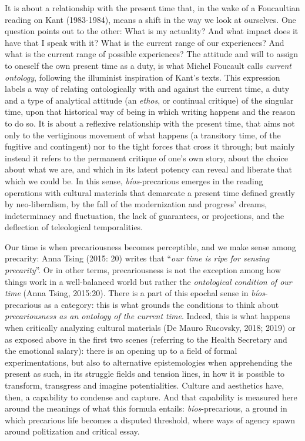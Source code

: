 \documentclass[a4paper,]{scrartcl}
\begin{document}
It is about a relationship with the present time that, in the wake of a
Foucaultian reading on Kant (1983-1984), means a shift in the way we
look at ourselves. One question points out to the other: What is my
actuality? And what impact does it have that I speak with it? What is
the current range of our experiences? And what is the current range of
possible experiences? The attitude and will to assign to oneself the own
present time as a duty, is what Michel Foucault calls \emph{current
ontology}, following the illuminist inspiration of Kant's texts. This
expression labels a way of relating ontologically with and against the
current time, a duty and a type of analytical attitude (an \emph{ethos},
or continual critique) of the singular time, upon that historical way of
being in which writing happens and the reason to do so. It is about a
reflexive relationship with the present time, that aims not only to the
vertiginous movement of what happens (a transitory time, of the fugitive
and contingent) nor to the tight forces that cross it through; but
mainly instead it refers to the permanent critique of one's own story,
about the choice about what we are, and which in its latent potency can
reveal and liberate that which we could be. In this sense,
\emph{bíos}-precarious emerges in the reading operations with cultural
materials that demarcate a present time defined greatly by
neo-liberalism, by the fall of the modernization and progress' dreams,
indeterminacy and fluctuation, the lack of guarantees, or projections,
and the deflection of teleological temporalities.

Our time is when precariousness becomes perceptible, and we make sense
among precarity: Anna Tsing (2015: 20) writes that ``\emph{our time is
ripe for sensing precarity}''. Or in other terms, precariousness is not
the exception among how things work in a well-balanced world but rather
the \emph{ontological condition of our time} (Anna Tsing, 2015:20).
There is a part of this epochal sense in \emph{bíos}-precarious as a
category: this is what grounds the conditions to think about
\emph{precariousness as an ontology of the current time}. Indeed, this
is what happens when critically analyzing cultural materials (De Mauro
Rucovsky, 2018; 2019) or as exposed above in the first two scenes
(referring to the Health Secretary and the emotional salary): there is
an opening up to a field of formal experimentations, but also to
alternative epistemologies when apprehending the present as such, in its
struggle fields and tension lines, in how it is possible to transform,
transgress and imagine potentialities. Culture and aesthetics have,
then, a capability to condense and capture. And that capability is
measured here around the meanings of what this formula entails:
\emph{bíos}-precarious, a ground in which precarious life becomes a
disputed threshold, where ways of agency spawn around politization and
critical essay.
\end{document}
